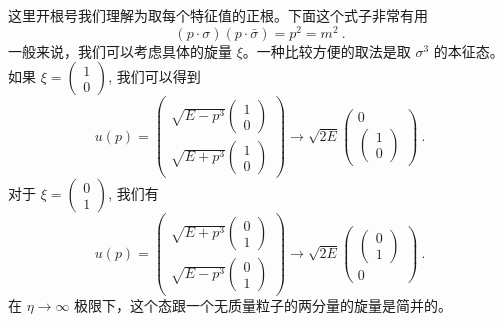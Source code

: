 这里开根号我们理解为取每个特征值的正根。下面这个式子非常有用
\begin{equation}
(p\cdot\sigma)(p\cdot \bar\sigma) = p^2 = m^2~.
\end{equation}
一般来说，我们可以考虑具体的旋量 $\xi$。一种比较方便的取法是取 $\sigma^3$ 的本征态。如果 $\xi=\begin{pmatrix}
1 \\ 0
\end{pmatrix}$, 我们可以得到
\begin{equation}\label{eq_diracs_2}
u(p) = \begin{pmatrix}
\sqrt{E-p^3}\begin{pmatrix}
1 \\ 0 
\end{pmatrix} \\
\sqrt{E+p^3}\begin{pmatrix}
1 \\ 0
\end{pmatrix}
\end{pmatrix} \rightarrow \sqrt{2E}\begin{pmatrix}
0  \\ 
\begin{pmatrix}
1 \\ 0
\end{pmatrix}
\end{pmatrix}~.
\end{equation}
对于 $\xi = \begin{pmatrix}
0 \\ 1
\end{pmatrix}$, 
我们有
\begin{equation}\label{eq_diracs_3}
u(p) = \begin{pmatrix}
\sqrt{E+p^3}\begin{pmatrix}
0 \\ 1 
\end{pmatrix} \\
\sqrt{E-p^3}\begin{pmatrix}
0 \\ 1
\end{pmatrix}
\end{pmatrix} \rightarrow \sqrt{2E}\begin{pmatrix}
\begin{pmatrix}
0 \\ 1
\end{pmatrix}  \\ 
0
\end{pmatrix}~.
\end{equation}
在 $\eta\rightarrow \infty$ 极限下，这个态跟一个无质量粒子的两分量的旋量是简并的。

